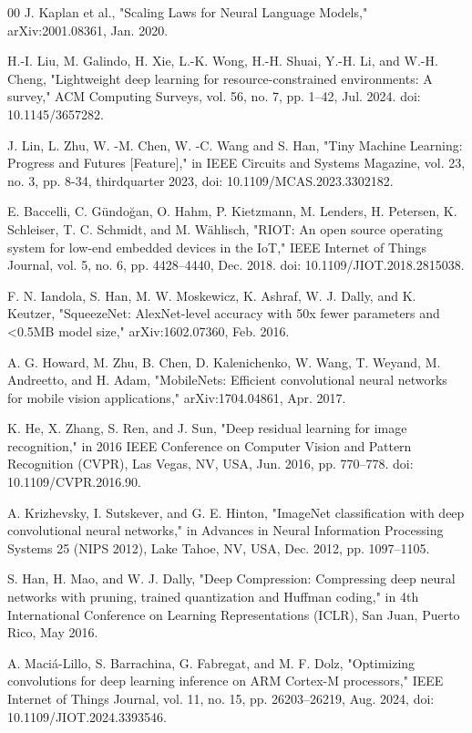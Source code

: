 \documentclass[conference]{IEEEtran}
\begin{document}
\begin{thebibliography}{00}
		J. Kaplan et al., "Scaling Laws for Neural Language Models," arXiv:2001.08361, Jan. 2020.
		
		H.-I. Liu, M. Galindo, H. Xie, L.-K. Wong, H.-H. Shuai, Y.-H. Li, and W.-H. Cheng, "Lightweight deep learning for resource-constrained environments: A survey," ACM Computing Surveys, vol. 56, no. 7, pp. 1–42, Jul. 2024. doi: 10.1145/3657282.
		
		J. Lin, L. Zhu, W. -M. Chen, W. -C. Wang and S. Han, "Tiny Machine Learning: Progress and Futures [Feature]," in IEEE Circuits and Systems Magazine, vol. 23, no. 3, pp. 8-34, thirdquarter 2023, doi: 10.1109/MCAS.2023.3302182.
		
		E. Baccelli, C. Gündoğan, O. Hahm, P. Kietzmann, M. Lenders, H. Petersen, K. Schleiser, T. C. Schmidt, and M. Wählisch, "RIOT: An open source operating system for low-end embedded devices in the IoT," IEEE Internet of Things Journal, vol. 5, no. 6, pp. 4428–4440, Dec. 2018. doi: 10.1109/JIOT.2018.2815038.
		
		F. N. Iandola, S. Han, M. W. Moskewicz, K. Ashraf, W. J. Dally, and K. Keutzer, "SqueezeNet: AlexNet-level accuracy with 50x fewer parameters and <0.5MB model size," arXiv:1602.07360, Feb. 2016.
		
		A. G. Howard, M. Zhu, B. Chen, D. Kalenichenko, W. Wang, T. Weyand, M. Andreetto, and H. Adam, "MobileNets: Efficient convolutional neural networks for mobile vision applications," arXiv:1704.04861, Apr. 2017.
		
		K. He, X. Zhang, S. Ren, and J. Sun, "Deep residual learning for image recognition," in 2016 IEEE Conference on Computer Vision and Pattern Recognition (CVPR), Las Vegas, NV, USA, Jun. 2016, pp. 770–778. doi: 10.1109/CVPR.2016.90.
		
		A. Krizhevsky, I. Sutskever, and G. E. Hinton, "ImageNet classification with deep convolutional neural networks," in Advances in Neural Information Processing Systems 25 (NIPS 2012), Lake Tahoe, NV, USA, Dec. 2012, pp. 1097–1105.
		
		S. Han, H. Mao, and W. J. Dally, "Deep Compression: Compressing deep neural networks with pruning, trained quantization and Huffman coding," in 4th International Conference on Learning Representations (ICLR), San Juan, Puerto Rico, May 2016.
		
		A. Maciá-Lillo, S. Barrachina, G. Fabregat, and M. F. Dolz, "Optimizing convolutions for deep learning inference on ARM Cortex-M processors," IEEE Internet of Things Journal, vol. 11, no. 15, pp. 26203–26219, Aug. 2024, doi: 10.1109/JIOT.2024.3393546.
		

\end{thebibliography}
\end{document}
